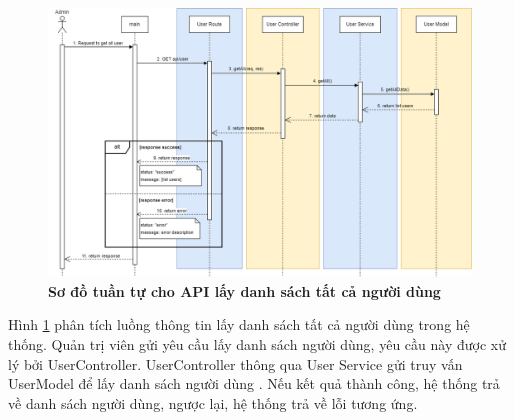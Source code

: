 \begin{figure}[H]
  \centering
  \includegraphics[scale=0.33]{Images/sequence_api/getAllUsers.png}
  \caption[Sơ đồ tuần tự cho API lấy danh sách tất cả người dùng ]{\bfseries \fontsize{12pt}{0pt}
  \selectfont Sơ đồ tuần tự cho API lấy danh sách tất cả người dùng }
  \label{api_getAllUser} %
\end{figure}
Hình \ref{api_getAllUser} phân tích luồng thông tin lấy danh sách tất cả người dùng trong hệ thống. Quản trị viên gửi yêu cầu lấy danh sách người dùng, yêu cầu này được xử lý bởi UserController. UserController thông qua User Service gửi truy vấn UserModel để lấy danh sách người dùng . 
Nếu kết quả thành công, hệ thống trả về danh sách người dùng, ngược lại, hệ thống trả về lỗi tương ứng.

